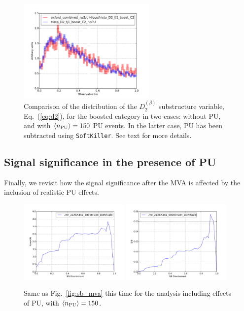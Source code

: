 \begin{figure}[t]
  \begin{center}
      \vspace{-1cm}
  \includegraphics[width=0.60\textwidth]{plots/pu-vs-nopu-comparison-d2.pdf}
  \caption{\small
    Comparison of the distribution of the $D_2^{(\beta)}$
    substructure variable, Eq.~(\ref{eq:d2}), for the
    boosted category in two cases: without PU, and
    with $\left\langle n_{\rm PU}\right\rangle=150$ PU events.
    In the latter case, PU has been subtracted using
    {\tt SoftKiller}.
    See text for more details.
}
\label{fig: pu-vs-nopu-comparison-d2}
\end{center}
\end{figure}

\subsection{Signal significance in the presence of PU}

Finally, we revisit how the signal significance after the MVA
is affected by the inclusion of realistic PU effects.


\begin{figure}[t]
\begin{center}
\includegraphics[width=0.48\textwidth]{plots/ssb_pu.pdf}
\includegraphics[width=0.48\textwidth]{plots/sb_pu.pdf}
\caption{\small
  Same as Fig.~\ref{fig:sb_mva} this time for the analysis including
  effects of PU, with $\left\langle n_{\rm PU}\right\rangle=150$.
}
\label{fig:sb_mva_pu}
\end{center}
\end{figure}


